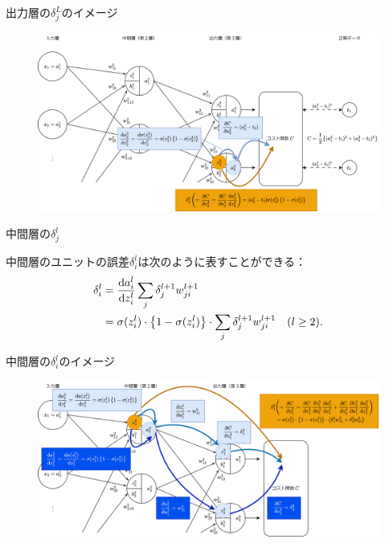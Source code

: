 \documentclass[dvipdfmx,aspectratio=169]{beamer}
\begin{document}
	\begin{frame}{出力層の$ \delta^L_j $のイメージ}
		\begin{figure}
			\centering
			\includegraphics[width=1.0\linewidth]{img/image-of-output-layer-unit-error}
		\end{figure}
	\end{frame}
	\begin{frame}{中間層の$ \delta^l_j $}
		\begin{screen}
			中間層のユニットの誤差$ \delta^l_i $は次のように表すことができる：
			\begin{align}
				\delta^l_i 	&= \dfrac{\mathrm{d}a^l_i}{\mathrm{d}z^l_i} \sum_j \delta^{l+1}_j w^{l+1}_{ji}\notag\\
				 			&= \sigma(z^l_i) \cdot \left\lbrace 1 - \sigma(z^l_i) \right\rbrace \cdot \sum_j \delta^{l+1}_j w^{l+1}_{ji}\quad (l \geq 2).\label{eq:hidden-layer-unit-error}
			\end{align}
		\end{screen}
	\end{frame}
	\begin{frame}{中間層の$ \delta^l_i $のイメージ}
		\begin{figure}
			\centering
			\includegraphics[width=\linewidth]{img/Image-of-hidden-layer-unit-error}
		\end{figure}
	\end{frame}
\end{document}
